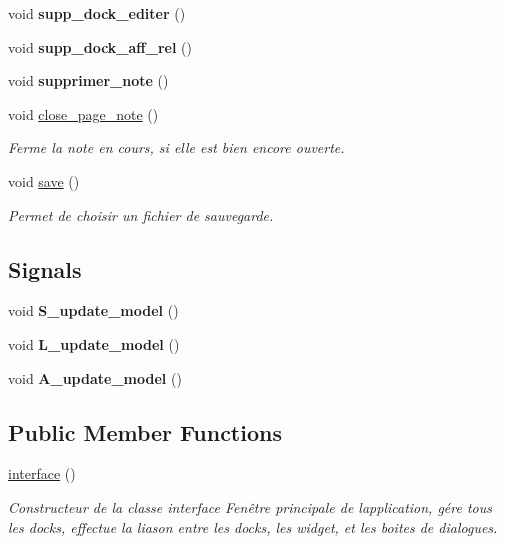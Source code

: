 \begin{DoxyCompactItemize}
\mbox{\label{classinterface_ab53612546e2db13b35dca0df8911413e}} 
void {\bfseries supp\+\_\+dock\+\_\+editer} ()
\item 
\mbox{\label{classinterface_a1a6237ea46e9abd0662b8ec19c556f5e}} 
void {\bfseries supp\+\_\+dock\+\_\+aff\+\_\+rel} ()
\item 
\mbox{\label{classinterface_aff7edfeead207b5e0fbbfc275a13a8ab}} 
void {\bfseries supprimer\+\_\+note} ()
\item 
\mbox{\label{classinterface_abe2464522932a5d8ed76d1ba02c9d2c6}} 
void \hyperlink{classinterface_abe2464522932a5d8ed76d1ba02c9d2c6}{close\+\_\+page\+\_\+note} ()
\begin{DoxyCompactList}\small\item\em Ferme la note en cours, si elle est bien encore ouverte. \end{DoxyCompactList}\item 
void \hyperlink{classinterface_a319f133949e2be97a203f725c3f1e565}{save} ()
\begin{DoxyCompactList}\small\item\em Permet de choisir un fichier de sauvegarde. \end{DoxyCompactList}\end{DoxyCompactItemize}
\subsection*{Signals}
\begin{DoxyCompactItemize}
\item 
\mbox{\label{classinterface_a300de30478e2e2616b61abad24bf319a}} 
void {\bfseries S\+\_\+update\+\_\+model} ()
\item 
\mbox{\label{classinterface_a7d829b8bd407c58d27b0849f4891f155}} 
void {\bfseries L\+\_\+update\+\_\+model} ()
\item 
\mbox{\label{classinterface_ad09217bb805eb4405dfc8d0b7cc6e547}} 
void {\bfseries A\+\_\+update\+\_\+model} ()
\end{DoxyCompactItemize}
\subsection*{Public Member Functions}
\begin{DoxyCompactItemize}
\item 
\hyperlink{classinterface_a13e0ee4b9df1714d747d62ec46220c55}{interface} ()
\begin{DoxyCompactList}\small\item\em Constructeur de la classe interface Fenêtre principale de l\textquotesingle{}application, gére tous les docks, effectue la liason entre les docks, les widget, et les boites de dialogues. \end{DoxyCompactList}\end{DoxyCompactItemize}


